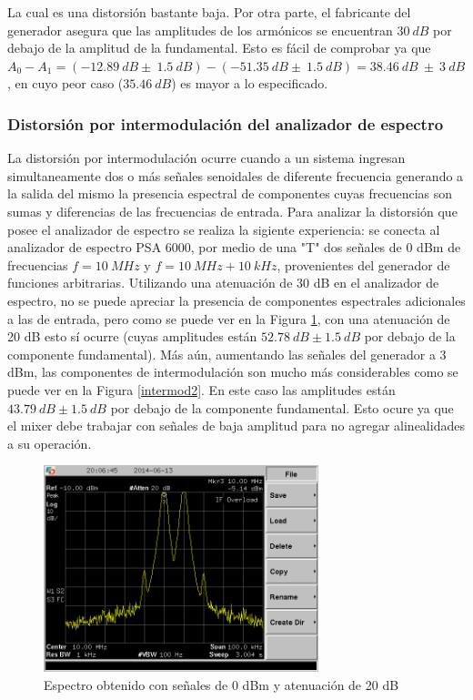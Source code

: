 \documentclass[a4paper,10pt]{article}
\begin{document}
		\indent La cual es una distorsi\'on bastante baja. Por otra parte, el 
		fabricante del generador asegura que las amplitudes de los arm\'onicos 
		se encuentran $30~dB$ por debajo de la amplitud de la fundamental. Esto 
		es f\'acil de comprobar ya que 
		$A_0-A_1=(-12.89~dB\pm~1.5~dB)-(-51.35~dB\pm~1.5~dB)=38.46~dB~\pm~3~dB$,
		en cuyo peor caso ($35.46~dB$) es mayor a lo especificado.
		
		\subsubsection{Distorsi\'on por intermodulaci\'on del analizador de 
		espectro}
		La distorsi\'on por intermodulaci\'on ocurre cuando a un sistema ingresan simultaneamente dos o m\'as se\~nales senoidales de diferente frecuencia generando a la salida del mismo la presencia espectral de componentes cuyas frecuencias son sumas y diferencias de las frecuencias de entrada.
		Para analizar la distorsi\'on que posee el analizador de espectro se realiza la sigiente experiencia: se conecta al analizador de espectro PSA 6000, por medio de una "T" dos se\~nales de 0 dBm de frecuencias $f=10~MHz$ y $f=10~MHz+10~kHz$, provenientes del generador de funciones arbitrarias. Utilizando una atenuaci\'on de 30 dB en el analizador de espectro, no se puede apreciar la presencia de componentes espectrales adicionales a las de entrada, pero como se puede ver en la Figura \ref{intermod1}, con una atenuaci\'on de 20 dB esto s\'i ocurre (cuyas amplitudes est\'an $52.78~dB\pm1.5~dB$ por debajo de la componente fundamental). M\'as a\'un, aumentando las se\~nales del generador a 3 dBm, las componentes de intermodulaci\'on son mucho m\'as considerables como se puede ver en la Figura \ref{intermod2}. En este caso las amplitudes est\'an $43.79~dB\pm1.5~dB$ por debajo de la componente fundamental. Esto ocure ya que el mixer debe trabajar con se\~nales de baja amplitud para no agregar alinealidades a su operaci\'on. 
		\begin{figure}[!htb]
				\centering
				\includegraphics[width=8cm]
				{Imagenes/SCREN446.png}
				\caption{Espectro obtenido con se\~nales de 0 dBm y atenuaci\'on de 20 dB}
				\label{intermod1} 
		\end{figure}
				
\end{document}
